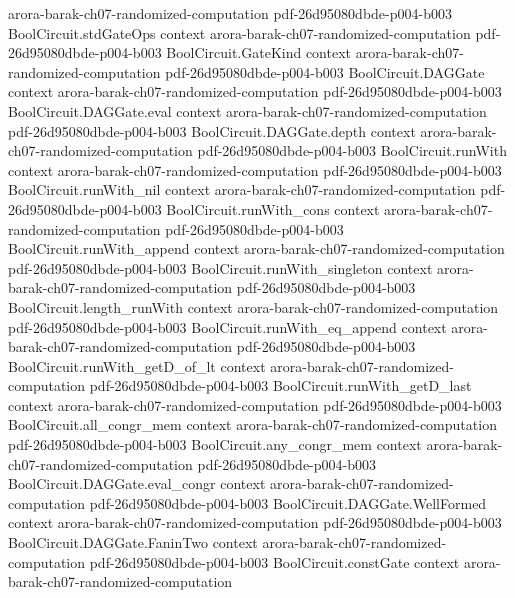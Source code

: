 \begin{theorem}
  {arora-barak-ch07-randomized-computation}
  {pdf-26d95080dbde-p004-b003}
\proofstep
  {BoolCircuit.stdGateOps}
  {context}
  {arora-barak-ch07-randomized-computation}
  {pdf-26d95080dbde-p004-b003}
\proofstep
  {BoolCircuit.GateKind}
  {context}
  {arora-barak-ch07-randomized-computation}
  {pdf-26d95080dbde-p004-b003}
\proofstep
  {BoolCircuit.DAGGate}
  {context}
  {arora-barak-ch07-randomized-computation}
  {pdf-26d95080dbde-p004-b003}
\proofstep
  {BoolCircuit.DAGGate.eval}
  {context}
  {arora-barak-ch07-randomized-computation}
  {pdf-26d95080dbde-p004-b003}
\proofstep
  {BoolCircuit.DAGGate.depth}
  {context}
  {arora-barak-ch07-randomized-computation}
  {pdf-26d95080dbde-p004-b003}
\proofstep
  {BoolCircuit.runWith}
  {context}
  {arora-barak-ch07-randomized-computation}
  {pdf-26d95080dbde-p004-b003}
\proofstep
  {BoolCircuit.runWith_nil}
  {context}
  {arora-barak-ch07-randomized-computation}
  {pdf-26d95080dbde-p004-b003}
\proofstep
  {BoolCircuit.runWith_cons}
  {context}
  {arora-barak-ch07-randomized-computation}
  {pdf-26d95080dbde-p004-b003}
\proofstep
  {BoolCircuit.runWith_append}
  {context}
  {arora-barak-ch07-randomized-computation}
  {pdf-26d95080dbde-p004-b003}
\proofstep
  {BoolCircuit.runWith_singleton}
  {context}
  {arora-barak-ch07-randomized-computation}
  {pdf-26d95080dbde-p004-b003}
\proofstep
  {BoolCircuit.length_runWith}
  {context}
  {arora-barak-ch07-randomized-computation}
  {pdf-26d95080dbde-p004-b003}
\proofstep
  {BoolCircuit.runWith_eq_append}
  {context}
  {arora-barak-ch07-randomized-computation}
  {pdf-26d95080dbde-p004-b003}
\proofstep
  {BoolCircuit.runWith_getD_of_lt}
  {context}
  {arora-barak-ch07-randomized-computation}
  {pdf-26d95080dbde-p004-b003}
\proofstep
  {BoolCircuit.runWith_getD_last}
  {context}
  {arora-barak-ch07-randomized-computation}
  {pdf-26d95080dbde-p004-b003}
\proofstep
  {BoolCircuit.all_congr_mem}
  {context}
  {arora-barak-ch07-randomized-computation}
  {pdf-26d95080dbde-p004-b003}
\proofstep
  {BoolCircuit.any_congr_mem}
  {context}
  {arora-barak-ch07-randomized-computation}
  {pdf-26d95080dbde-p004-b003}
\proofstep
  {BoolCircuit.DAGGate.eval_congr}
  {context}
  {arora-barak-ch07-randomized-computation}
  {pdf-26d95080dbde-p004-b003}
\proofstep
  {BoolCircuit.DAGGate.WellFormed}
  {context}
  {arora-barak-ch07-randomized-computation}
  {pdf-26d95080dbde-p004-b003}
\proofstep
  {BoolCircuit.DAGGate.FaninTwo}
  {context}
  {arora-barak-ch07-randomized-computation}
  {pdf-26d95080dbde-p004-b003}
\proofstep
  {BoolCircuit.constGate}
  {context}
  {arora-barak-ch07-randomized-computation}

\end{theorem}
